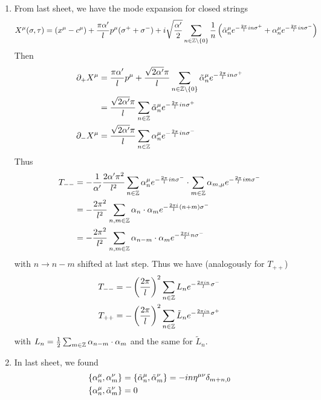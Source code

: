 \begin{enumerate}[label=(\alph*)]
	\item  From last sheet, we have the mode expansion for closed strings
		\begin{equation*}
			X^\mu (\sigma, \tau) =  (x^\mu - c^\mu) + \frac{\pi \alpha'}{l} p^\mu (\sigma^+ + \sigma^-)  + i \sqrt{\frac{\alpha'}{2}} \sum_{n \in \mathbb{Z} \setminus \{0\}} \frac{1}{n} \left( \tilde{\alpha}_n^\mu e^{-\frac{2\pi}{l} i n \sigma^+} + \alpha_n^\mu e^{-\frac{2\pi}{l} i n \sigma^-} \right)\\
		\end{equation*}
		Then
		\begin{align*}
			\partial_+ X^\mu &=   \frac{\pi \alpha'}{l} p^\mu + \frac{\sqrt{2\alpha'} \pi}{l} \sum_{n \in \mathbb{Z} \setminus \{0\}}  \tilde{\alpha}_n^\mu e^{-\frac{2\pi}{l} i n \sigma^+} \\
								  &= \frac{\sqrt{2\alpha'} \pi}{l} \sum_{n \in \mathbb{Z} }  \tilde{\alpha}_n^\mu e^{-\frac{2\pi}{l} i n \sigma^+}\\
			\partial_- X^\mu &=  \frac{\sqrt{2\alpha'} \pi}{l} \sum_{n \in \mathbb{Z} }  {\alpha}_n^\mu e^{-\frac{2\pi}{l} i n \sigma^-} 
		\end{align*}
		Thus
		\begin{align*}
			T_{--} &=  - \frac{1}{\alpha'} \frac{2 \alpha' \pi^2}{l^2} \sum_{n \in \mathbb{Z} }  {\alpha}_n^\mu e^{-\frac{2\pi}{l} i n \sigma^-} \cdot \sum_{m \in \mathbb{Z} }  {\alpha}_{m,\mu} e^{-\frac{2\pi}{l} i m \sigma^-} \\
					 &= - \frac{2\pi^2}{l^2} \sum_{n, m \in \mathbb{Z}} \alpha_{n} \cdot \alpha_{m} e^{- \frac{2\pi i }{l} (n+m) \sigma^-} \\
					 &= - \frac{2\pi^2}{l^2} \sum_{n, m \in \mathbb{Z}} \alpha_{n-m} \cdot \alpha_{m} e^{- \frac{2\pi i }{l} n \sigma^-}
		\end{align*}
		with $n \rightarrow n-m$ shifted at last step. Thus we have (analogously for $T_{++}$)
		\begin{align}
			T_{--} &= - \left( \frac{2\pi}{l} \right)^2 \sum_{n\in \mathbb{Z}} L_n e^{- \frac{2\pi i n}{l} \sigma^- } \\
			T_{++} &= - \left( \frac{2\pi}{l} \right)^2 \sum_{n\in \mathbb{Z}} \tilde{L}_n e^{- \frac{2\pi i n}{l} \sigma^+ }
		\end{align}
		with $L_n = \frac{1}{2} \sum_{m \in \mathbb{Z}} \alpha_{n-m} \cdot \alpha_{m}$ and the same for $\tilde{L}_n$.

	\item In last sheet, we found
		\begin{align}
			\acomm{\alpha_n^\mu}{\alpha^\nu_m} &= \acomm{\tilde\alpha_n^\mu}{\tilde\alpha^\nu_m} = -in \eta^{\mu\nu} \delta_{m+n,0} \\
			\acomm{\alpha_n^\mu}{\tilde\alpha^\nu_m} &= 0 \label{math:LLtilde}
		\end{align}
		

\end{enumerate}
